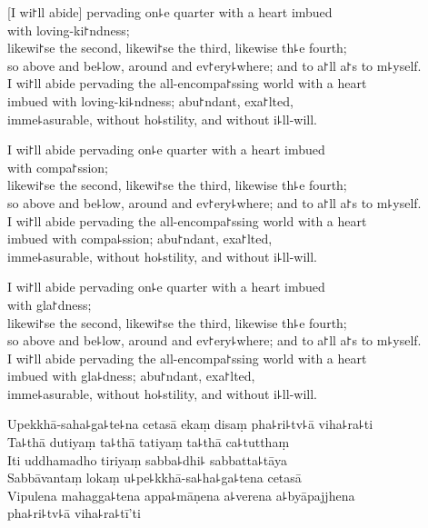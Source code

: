 \begin{leader}
\end{leader}

[I wi꜓ll abide] pervading on꜕e quarter with a heart imbued\\
\vin with loving-ki꜓ndness;\\
likewi꜓se the second, likewi꜓se the third, likewise th꜕e fourth;\\
so above and be꜕low, around and ev꜓ery꜕where; and to a꜓ll a꜓s to m꜕yself.\\
I wi꜓ll abide pervading the all-encompa꜓ssing world with a heart \\
imbued with loving-ki꜕ndness; abu꜓ndant, exa꜓lted,\\
\vin imme꜕asurable, without ho꜕stility, and without i꜕ll-will.

I wi꜓ll abide pervading on꜕e quarter with a heart imbued\\
\vin with compa꜓ssion;\\
likewi꜓se the second, likewi꜓se the third, likewise th꜕e fourth;\\
so above and be꜕low, around and ev꜓ery꜕where; and to a꜓ll a꜓s to m꜕yself.\\
I wi꜓ll abide pervading the all-encompa꜓ssing world with a heart \\
imbued with compa꜕ssion; abu꜓ndant, exa꜓lted,\\
\vin imme꜕asurable, without ho꜕stility, and without i꜕ll-will.

I wi꜓ll abide pervading on꜕e quarter with a heart imbued\\
\vin with gla꜓dness;\\
likewi꜓se the second, likewi꜓se the third, likewise th꜕e fourth;\\
so above and be꜕low, around and ev꜓ery꜕where; and to a꜓ll a꜓s to m꜕yself.\\
I wi꜓ll abide pervading the all-encompa꜓ssing world with a heart \\
imbued with gla꜕dness; abu꜓ndant, exa꜓lted,\\
\vin imme꜕asurable, without ho꜕stility, and without i꜕ll-will.


\clearpage

Upekkhā-saha꜕ga꜕te꜕na cetasā ekaṃ disaṃ pha꜕ri꜕tv꜕ā viha꜕ra꜕ti\\%
Ta꜕thā dutiyaṃ ta꜕thā tatiyaṃ ta꜕thā ca꜕tutthaṃ\\
Iti uddhamadho tiriyaṃ sabba꜕dhi꜕ sabbatta꜕tāya\\
Sabbāvantaṃ lokaṃ u꜕pe꜕kkhā-sa꜕ha꜕ga꜕tena cetasā\\
Vipulena mahagga꜕tena appa꜕māṇena a꜕verena a꜕byāpajjhena\\
\vin pha꜕ri꜕tv꜕ā viha꜕ra꜕tī'ti

